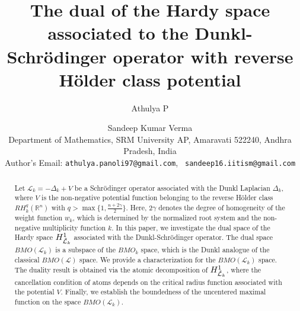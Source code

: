 \documentclass[11pt, reqno]{amsproc}
\theoremstyle{definition}
\theoremstyle{remark}
\numberwithin{equation}{section}
\begin{document}
\setcounter{page}{1}

\title[Dual of the Hatdy space associated to the Dunkl-Schr\"odinger operator]
 {The dual of the Hardy space associated to the Dunkl-Schr\"odinger operator with reverse H\"older class potential}

 \author[Athulya P, S.K. Verma]{
  Athulya P \and Sandeep Kumar Verma \\
\small{Department of Mathematics, SRM University AP, Amaravati 522240, Andhra Pradesh, India}\\ 
    Author's Email: \texttt{athulya.panoli97@gmail.com}, \texttt{ sandeep16.iitism@gmail.com}
}



\begin{abstract}  
Let $\mathcal{L}_k = -\Delta_k + V$ be a Schr\"odinger operator associated with the Dunkl Laplacian $\Delta_k$, where $V$ is the non-negative potential function belonging to the reverse H\"older class  $RH_k^q(\mathbb{R}^n)$ with $q> \max\{1, \frac{n+2\gamma}{2}\}$. Here, $2\gamma$ denotes the degree of homogeneity of the weight function $w_k$, which is determined by the normalized root system and the non-negative multiplicity function $k$. In this paper, we investigate the dual space of the Hardy space $H_{\Tilde{\mathcal{L}}_k}^1$ associated with the Dunkl-Schr\"odinger operator. The dual space $BMO(\mathcal{L}_k)$ is a subspace of the $BMO_k$ space, which is the Dunkl analogue of the classical $BMO(\mathcal{L})$ space. We provide a characterization for the $BMO(\mathcal{L}_k)$ space. The duality result is obtained via the atomic decomposition of $H_{\Tilde{\mathcal{L}}_k}^1$, where the cancellation condition of atoms depends on the critical radius function associated with the potential $V$. Finally, we establish the boundedness of the uncentered maximal function on the space $BMO(\mathcal{L}_k)$.
\end{abstract}
\maketitle
\end{document}
